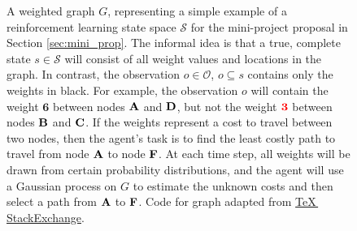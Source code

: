 \begin{figure}
\begin{center}
    \end{center}
    \caption{A weighted graph $G$, representing a simple example of a reinforcement learning state space $\mathcal S$ for the mini-project proposal in Section \ref{sec:mini_prop}. The informal idea is that a true, complete state $s \in \mathcal S$ will consist of all weight values and locations in the graph. In contrast, the observation $o \in \mathcal O$, $o \subseteq s$ contains only the weights in black. For example, the observation $o$ will contain the weight $\mathbf 6$ between nodes $\textbf A$ and $\textbf D$, but not the weight $\textcolor{red}{\mathbf 3}$ between nodes $\textbf B$ and $\textbf C$.  If the weights represent a cost to travel between two nodes, then the agent's task is to find the least costly path to travel from node $\textbf A$ to node $\textbf F$. At each time step, all weights will be drawn from certain probability distributions, and the agent will use a Gaussian process on $G$ to estimate the unknown costs and then select a path from $\textbf A$ to $\textbf F$. Code for graph adapted from \href{https://tex.stackexchange.com/questions/270543/draw-a-graph-in-latex-with-tikz}{\TeX\,StackExchange}.}
    \label{fig:prop_graph}
\end{figure}


